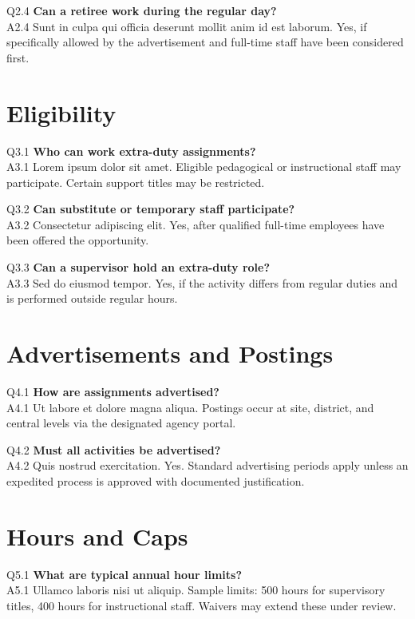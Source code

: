 \documentclass[11pt,a4paper,oneside]{article}
\begin{document}
\noindent Q2.4 \textbf{Can a retiree work during the regular day?}\\
\noindent A2.4 Sunt in culpa qui officia deserunt mollit anim id est laborum. Yes, if specifically allowed by the advertisement and full-time staff have been considered first.\vspace{6pt}

\section{Eligibility}
\noindent Q3.1 \textbf{Who can work extra-duty assignments?}\\
\noindent A3.1 Lorem ipsum dolor sit amet. Eligible pedagogical or instructional staff may participate. Certain support titles may be restricted.\vspace{6pt}

\noindent Q3.2 \textbf{Can substitute or temporary staff participate?}\\
\noindent A3.2 Consectetur adipiscing elit. Yes, after qualified full-time employees have been offered the opportunity.\vspace{6pt}

\noindent Q3.3 \textbf{Can a supervisor hold an extra-duty role?}\\
\noindent A3.3 Sed do eiusmod tempor. Yes, if the activity differs from regular duties and is performed outside regular hours.\vspace{6pt}

\section{Advertisements and Postings}
\noindent Q4.1 \textbf{How are assignments advertised?}\\
\noindent A4.1 Ut labore et dolore magna aliqua. Postings occur at site, district, and central levels via the designated agency portal.\vspace{6pt}

\noindent Q4.2 \textbf{Must all activities be advertised?}\\
\noindent A4.2 Quis nostrud exercitation. Yes. Standard advertising periods apply unless an expedited process is approved with documented justification.\vspace{6pt}

\section{Hours and Caps}
\noindent Q5.1 \textbf{What are typical annual hour limits?}\\
\noindent A5.1 Ullamco laboris nisi ut aliquip. Sample limits: 500 hours for supervisory titles, 400 hours for instructional staff. Waivers may extend these under review.\vspace{6pt}
\end{document}
